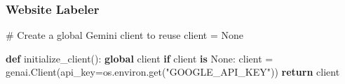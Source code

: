 \documentclass[
  titlepage]{article}
\newenvironment{Shaded}{\begin{snugshade}}{\end{snugshade}}
\newcommand{\CommentTok}[1]{\textcolor[rgb]{0.37,0.37,0.37}{#1}}
\newcommand{\ControlFlowTok}[1]{\textcolor[rgb]{0.00,0.23,0.31}{\textbf{#1}}}
\newcommand{\KeywordTok}[1]{\textcolor[rgb]{0.00,0.23,0.31}{\textbf{#1}}}
\newcommand{\NormalTok}[1]{\textcolor[rgb]{0.00,0.23,0.31}{#1}}
\newcommand{\OperatorTok}[1]{\textcolor[rgb]{0.37,0.37,0.37}{#1}}
\newcommand{\StringTok}[1]{\textcolor[rgb]{0.13,0.47,0.30}{#1}}
\newcommand{\VariableTok}[1]{\textcolor[rgb]{0.07,0.07,0.07}{#1}}
\begin{document}
\subsubsection{Website Labeler}\label{website-labeler}

\begin{Shaded}
\begin{Highlighting}[]
\CommentTok{\# Create a global Gemini client to reuse}
\NormalTok{client }\OperatorTok{=} \VariableTok{None}

\KeywordTok{def}\NormalTok{ initialize\_client():}
    \KeywordTok{global}\NormalTok{ client}
    \ControlFlowTok{if}\NormalTok{ client }\KeywordTok{is} \VariableTok{None}\NormalTok{:}
\NormalTok{        client }\OperatorTok{=}\NormalTok{ genai.Client(api\_key}\OperatorTok{=}\NormalTok{os.environ.get(}\StringTok{"GOOGLE\_API\_KEY"}\NormalTok{))}
    \ControlFlowTok{return}\NormalTok{ client}
\end{Highlighting}
\end{Shaded}
\end{document}
